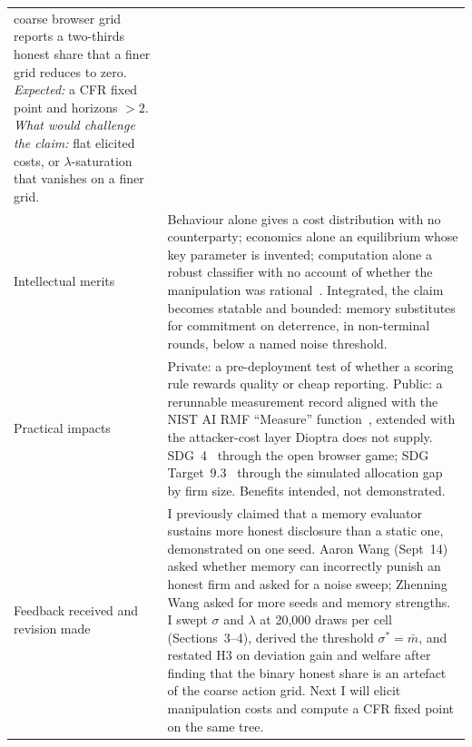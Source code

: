 \begin{table}[t]
\begin{tabularx}{\textwidth}{@{}p{26mm}Y@{}}
coarse browser grid reports a two-thirds honest share that a finer grid reduces
to zero. \emph{Expected:} a CFR
fixed point and horizons $>2$. \emph{What would challenge the claim:} flat
elicited costs, or $\lambda$-saturation that vanishes on a finer grid. \\
Intellectual merits & Behaviour alone gives a cost distribution with no
counterparty; economics alone an equilibrium whose key parameter is invented;
computation alone a robust classifier with no account of whether the
manipulation was rational~\cite{osullivan2025}. Integrated, the claim becomes
statable and bounded: memory substitutes for commitment on deterrence, in
non-terminal rounds, below a named noise threshold. \\
Practical impacts & Private: a pre-deployment test of whether a scoring rule
rewards quality or cheap reporting. Public: a rerunnable measurement record
aligned with the NIST AI RMF ``Measure'' function~\cite{nist2023}, extended with
the attacker-cost layer Dioptra does not supply. SDG~4~\cite{un_sdg4} through
the open browser game; SDG Target~9.3~\cite{un2025} through the simulated
allocation gap by firm size. Benefits intended, not demonstrated. \\
Feedback received and revision made & I previously claimed that a memory
evaluator sustains more honest disclosure than a static one, demonstrated on one
seed. Aaron Wang (Sept~14) asked whether memory can incorrectly punish an honest
firm and asked for a noise sweep; Zhenning Wang asked for more seeds and memory
strengths. I swept $\sigma$ and $\lambda$ at 20{,}000 draws per cell
(Sections~3--4), derived the threshold $\sigma^{*}=\bar m$, and restated H3 on
deviation gain and welfare after finding that the binary honest share is an
artefact of the coarse action grid. Next I will elicit manipulation costs and compute a CFR fixed point
on the same tree. \\
\bottomrule
\end{tabularx}
\end{table}
